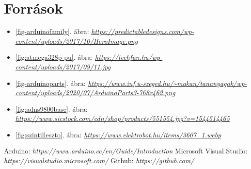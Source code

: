 \documentclass[]{thesis-ekf}
\theoremstyle{definition}
\theoremstyle{remark}
\begin{document}
\chapter*{Források}
\begin{itemize}
	\item \ref{fig-arduinofamily}. ábra: \emph{\url{https://predictabledesigns.com/wp-content/uploads/2017/10/HeroImage.png}}
	\item \ref{fig:atmega328p-pu}. ábra: \emph{\url{https://techfun.hu/wp-content/uploads/2017/09/11.jpg}}
	\item \ref{fig-arduinoparts}. ábra: \emph{\url{https://www.inf.u-szeged.hu/~makan/tananyagok/wp-content/uploads/2020/07/ArduinoParts3-768x462.png}}
	\item \ref{fig:adns9800base}. ábra: \emph{\url{https://www.sicstock.com/cdn/shop/products/551554.jpg?v=1544514465}}
	\item \ref{fig:szintilleszto}. ábra: \emph{\url{https://www.elektrobot.hu/items/3607_1.webp}}
\end{itemize}

\begin{thebibliography}{2}
 Arduino: \emph{https://www.arduino.cc/en/Guide/Introduction}
 Microsoft Visual Studio: \emph{https://visualstudio.microsoft.com/}
 Github: \emph{https://github.com/}
\end{thebibliography}


\end{document}
